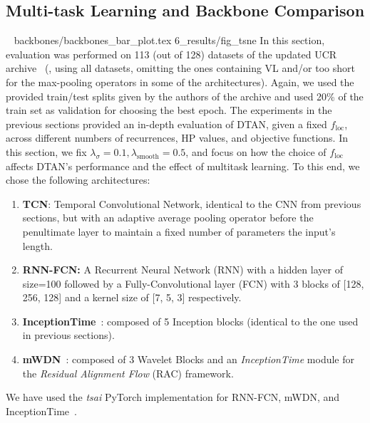 \subsection{Multi-task Learning and Backbone Comparison}~\label{Sec:Results:sub:MTDTAN}
{backbones/backbones_bar_plot.tex}
{6_results/fig_tsne}
In this section, evaluation was performed on 113 (out of 128) datasets of the updated UCR archive~\cite{Dau:2019:ucr} (\ie, using all datasets,
omitting the ones containing VL and/or too short for the max-pooling operators in some of the architectures). Again, we used the provided train/test splits given by the authors
 of the archive and used 20\% of the train set as validation for choosing the best epoch.
The experiments in the previous sections provided an in-depth evaluation of DTAN, given a fixed $f_{\mathrm{loc}}$, across different numbers of recurrences, HP values, and objective functions. In this section, we fix
$\lambda_{\sigma}=0.1, \lambda_{\mathrm{smooth}}=0.5$, and focus on how the choice of $f_{\mathrm{loc}}$ affects DTAN's performance and the effect of multitask learning. 
To this end, we chose the following %
architectures:
\begin{enumerate}
    \item \textbf{TCN}: Temporal Convolutional Network, 
    identical to the CNN from previous sections, but with an
    adaptive average pooling operator before the penultimate layer to maintain a fixed number of parameters \wrt the input's length.
    \item \textbf{RNN-FCN:} A Recurrent Neural Network (RNN) with a hidden layer of size=100 followed by a Fully-Convolutional layer (FCN)
    with 3 blocks of [128, 256, 128] and a kernel size of [7, 5, 3] respectively.
    \item \textbf{InceptionTime}~\cite{Ismail:2020:inceptiontime}: composed of 5 Inception blocks (identical to the one used in previous sections). 
    \item \textbf{mWDN}~\cite{wang:SIGKDD:multilevel:2018}: composed of 3 Wavelet Blocks and an \emph{InceptionTime} module for the 
    \emph{Residual Alignment Flow} (RAC) framework. 
\end{enumerate}
 We have used the \emph{tsai} PyTorch implementation for RNN-FCN, mWDN, and InceptionTime~\cite{Ignacio:tsai}. 


